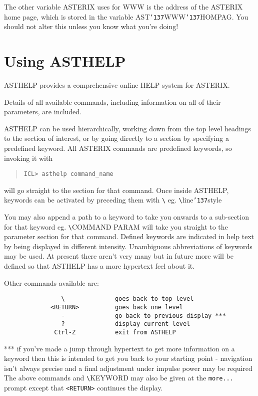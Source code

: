 \documentclass{book}
\renewcommand{\_}{{\tt\char'137}}     %
\begin{document}
The other variable ASTERIX uses for WWW is the address of the
ASTERIX home page, which is stored in the variable AST\_WWW\_HOMPAG.
You should not alter this unless you know what you're doing!
 
\chapter{Using ASTHELP}
ASTHELP provides a comprehensive online HELP system for ASTERIX.
 
Details of all available commands, including information on all
of their parameters, are included.
 
ASTHELP can be used hierarchically, working down from the
top level headings to the section of interest, or by going
directly to a section by specifying a predefined keyword.
All ASTERIX commands are predefined keywords, so invoking it
with
 
\begin{quote}\begin{verbatim}
ICL> asthelp command_name
\end{verbatim}\end{quote}
will go straight to the section for that command. Once inside
ASTHELP, keywords can be activated by preceding them with \verb+\+
eg. \verb+\+line\_style
 
You may also append a path to a keyword to take you onwards
to a sub-section for that keyword eg. \verb+\+COMMAND PARAM will
take you straight to the parameter section for that command.
Defined keywords are indicated in help text by being displayed
in different intensity. Unambiguous abbreviations of keywords
may be used. At present there aren't very many but in future
more will be defined so that ASTHELP has a more hypertext feel
about it.
 
Other commands available are:
 
\begin{verbatim}
                \              goes back to top level
             <RETURN>          goes back one level
                -              go back to previous display ***
                ?              display current level
              Ctrl-Z           exit from ASTHELP
\end{verbatim}
*** if you've made a jump through hypertext to get more
information on a keyword then this is intended to
get you back to your starting point - navigation
isn't always precise and a final adjustment under
impulse power may be required
The above commands and \verb+\+KEYWORD may also be given at the
{\tt more...} prompt except that \verb+<RETURN>+ continues the display.
 
\end{document}
